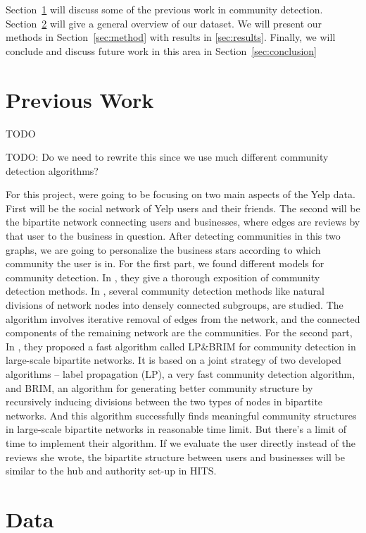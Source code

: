 \documentclass[10pt]{article}
\begin{document}
Section~\ref{sec:prevwork} will discuss some of the previous work in community detection.  Section~\ref{sec:data} will give a general overview of our dataset. We will present our methods in Section~\ref{sec:method} with results in \ref{sec:results}.  Finally, we will conclude and discuss future work in this area in Section~\ref{sec:conclusion}


\section{Previous Work}
\label{sec:prevwork}
TODO

TODO: Do we need to rewrite this since we use much different community detection algorithms?




For this project, were going to be focusing on two main aspects of the Yelp data. First will be
the social network of Yelp users and their friends. The second will be the bipartite network
connecting users and businesses, where edges are reviews by that user to the business
in question. After detecting communities in this two graphs, we are going to personalize
the business stars according to which community the user is in. For the first part, we found different models
for community detection. In \cite{fortunato2010community}, they give a thorough exposition of community detection methods. In \cite{newman2004finding}, several community detection methods like natural divisions of network nodes
into densely connected subgroups, are studied. The algorithm involves iterative removal
of edges from the network, and the connected components of the remaining network are the communities. For the second part, In \cite{liu2009community}, they proposed a fast algorithm called LP\&BRIM for community detection in large-scale bipartite networks. It is based on a joint strategy of two developed algorithms -- label propagation (LP), a very fast community detection algorithm, and BRIM, an algorithm for generating better community structure by recursively inducing divisions between the two types of nodes in bipartite networks. And this algorithm successfully finds meaningful community structures in large-scale bipartite networks in reasonable time limit. But there's a limit of time to implement their algorithm. If we evaluate the user directly instead of the reviews she wrote, the bipartite structure between users and businesses will be similar to the hub and authority set-up in HITS.



\section{Data}
\label{sec:data}
\end{document}
